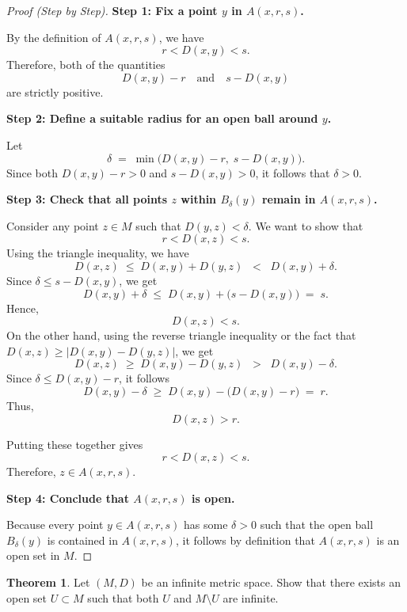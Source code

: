 \documentclass[12pt]{article}
\theoremstyle{definition} %
\newtheorem{theorem}{Theorem}
\theoremstyle{plain} %
\begin{document}
            \begin{proof}[Proof (Step by Step)]
            \textbf{Step 1: Fix a point $y$ in $A(x,r,s)$.}
            
            By the definition of $A(x,r,s)$, we have
            \[
            r < D(x,y) < s.
            \]
            Therefore, both of the quantities
            \[
            D(x,y) - r
            \quad \text{and} \quad
            s - D(x,y)
            \]
            are strictly positive.
            
            \medskip
            
            \textbf{Step 2: Define a suitable radius for an open ball around $y$.}
            
            Let
            \[
            \delta \;=\; \min\bigl(D(x,y) - r, \; s - D(x,y)\bigr).
            \]
            Since both $D(x,y) - r > 0$ and $s - D(x,y) > 0$, it follows that $\delta > 0.$
            
            \medskip
            
            \textbf{Step 3: Check that all points $z$ within $B_\delta(y)$ remain in $A(x,r,s)$.}
            
            Consider any point $z \in M$ such that $D(y,z) < \delta.$  
            We want to show that 
            \[
            r < D(x,z) < s.
            \]
            Using the triangle inequality, we have
            \[
            D(x,z) \;\le\; D(x,y) + D(y,z)
            \;\;<\;\; D(x,y) + \delta.
            \]
            Since $\delta \le s - D(x,y)$, we get
            \[
            D(x,y) + \delta \;\le\; D(x,y) + \bigl(s - D(x,y)\bigr) \;=\; s.
            \]
            Hence,
            \[
            D(x,z) < s.
            \]
            On the other hand, using the reverse triangle inequality or the fact that $D(x,z) \ge |D(x,y) - D(y,z)|$, we get
            \[
            D(x,z) \;\ge\; D(x,y) - D(y,z)
            \;\;>\;\; D(x,y) - \delta.
            \]
            Since $\delta \le D(x,y) - r$, it follows
            \[
            D(x,y) - \delta \;\ge\; D(x,y) - \bigl(D(x,y) - r\bigr) \;=\; r.
            \]
            Thus,
            \[
            D(x,z) > r.
            \]
            
            Putting these together gives
            \[
            r < D(x,z) < s.
            \]
            Therefore, $z \in A(x,r,s)$.
            
            \medskip
            
            \textbf{Step 4: Conclude that $A(x,r,s)$ is open.}
            
            Because every point $y \in A(x,r,s)$ has some $\delta>0$ such that the open ball $B_\delta(y)$ is contained in $A(x,r,s)$, it follows by definition that $A(x,r,s)$ is an open set in $M$.
            
            \end{proof}
            \begin{theorem}
                Let $(M,D)$ be an infinite metric space. Show that there exists an open set $U \subset M$ such that both $U$ and $M \setminus U$ are infinite.
                \end{theorem}
                
\end{document}
